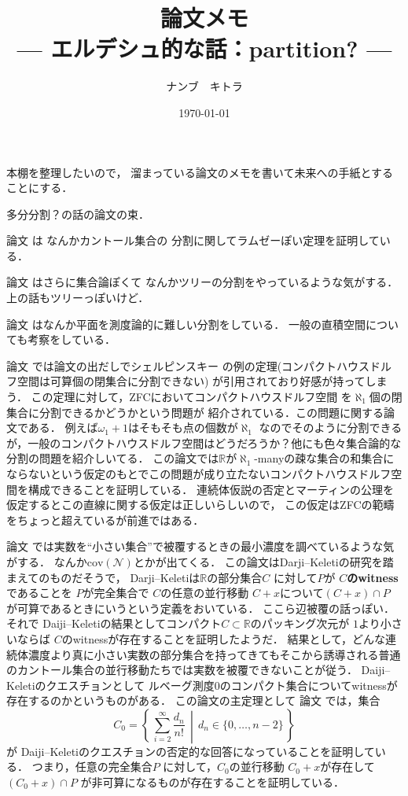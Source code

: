 \documentclass[leqno, a4paper, 12pt]{jsarticle}
\title{論文メモ
\large{\\--- エルデシュ的な話：partition? ---}
}
\author{ナンブ　キトラ}
\date{\today}
\newcommand{\rr}{\mathbb{R}}
\begin{document}
\maketitle

本棚を整理したいので，
溜まっている論文のメモを書いて未来への手紙とすることにする．

多分分割？の話の論文の束．

論文
\cite{MR0609665}
は
なんかカントール集合の
分割に関してラムゼーぽい定理を証明している．

論文
\cite{MR0200172}
はさらに集合論ぽくて
なんかツリーの分割をやっているような気がする．
上の話もツリーっぽいけど．



論文
\cite{MR0072928}
はなんか平面を測度論的に難しい分割をしている．
一般の直積空間についても考察をしている．

論文
\cite{MR1207473}
では論文の出だしでシェルピンスキー
の例の定理(コンパクトハウスドルフ空間は可算個の閉集合に分割できない)
が引用されており好感が持ってしまう．
この定理に対して，ZFCにおいてコンパクトハウスドルフ空間
を$\aleph_{1}$個の閉集合に分割できるかどうかという問題が
紹介されている．この問題に関する論文である．
例えば$\omega_{1}+1$はそもそも点の個数が$\aleph_{1}$
なのでそのように分割できるが，一般のコンパクトハウスドルフ空間はどうだろうか？他にも色々集合論的な分割の問題を紹介しいてる．
この論文では$\rr$が$\aleph_{1}$-manyの疎な集合の和集合にならないという仮定のもとでこの問題が成り立たないコンパクトハウスドルフ空間を構成できることを証明している．
連続体仮説の否定とマーティンの公理を仮定するとこの直線に関する仮定は正しいらしいので，
この仮定はZFCの範疇をちょっと超えているが前進ではある．

論文
\cite{MR2071696}
では実数を``小さい集合''で被覆するときの最小濃度を調べているような気がする．
なんか$\mathrm{cov}(\mathcal{N})$とかが出てくる．
この論文はDarji--Keletiの研究を踏まえてのものだそうで，
Darji--Keletiは$\rr$の部分集合$C$
に対して$P$が
\textbf{$C$のwitness}
であることを
$P$が完全集合で
$C$の任意の並行移動
$C+x$について$(C+x)\cap P$
が可算であるときにいうという定義をおいている．
ここら辺被覆の話っぽい．
それで
Daiji--Keletiの結果としてコンパクト$C\subset \rr$のパッキング次元が
$1$より小さいならば
$C$のwitnessが存在することを証明したようだ．
結果として，どんな連続体濃度より真に小さい実数の部分集合を持ってきてもそこから誘導される普通のカントール集合の並行移動たちでは実数を被覆できないことが従う．
Daiji--Keletiのクエスチョンとして
ルベーグ測度0のコンパクト集合についてwitnessが存在するのかというものがある．
この論文の主定理として
論文
\cite{MR2071696}
では，集合
\[
C_{0}=\left\{\, \sum_{i=2}^{\infty}\frac{d_{n}}{n!}
\, \middle|\, 
d_{n}\in \{0, \dots, n-2\}
\, \right\}
\]
が
Daiji--Keletiのクエスチョンの否定的な回答になっていることを証明している．
つまり，任意の完全集合$P$
に対して，$C_{0}$の並行移動
$C_{0}+x$が存在して
$(C_{0}+x)\cap P$
が非可算になるものが存在することを証明している．
\end{document}
